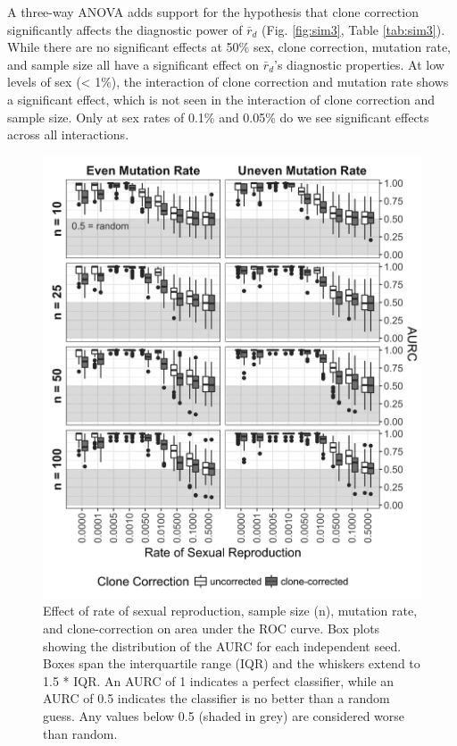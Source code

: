 \documentclass[double,11pt]{beavtex}
\begin{document}
  A three-way ANOVA adds support for the hypothesis that clone correction
  significantly affects the diagnostic power of \(\bar{r}_d\) (Fig.
  \ref{fig:sim3}, Table \ref{tab:sim3}). While there are no significant
  effects at 50\% sex, clone correction, mutation rate, and sample size
  all have a significant effect on \(\bar{r}_d\)'s diagnostic properties.
  At low levels of sex (\textless{} 1\%), the interaction of clone
  correction and mutation rate shows a significant effect, which is not
  seen in the interaction of clone correction and sample size. Only at sex
  rates of 0.1\% and 0.05\% do we see significant effects across all
  interactions.
  
  \begin{figure}
  
  {\centering \includegraphics[width=0.8\linewidth]{figure/simulations/AURC_box_plot} 
  
  }
  
  \caption[Effect of rate of sexual reproduction, sample size, mutation
  rate, and clone-correction on area under the ROC curve.]{Effect of rate of sexual reproduction, sample size (n), mutation rate,
  and clone-correction on area under the ROC curve. Box plots showing the
  distribution of the AURC for each independent seed. Boxes span the interquartile
  range (IQR) and the whiskers extend to 1.5 * IQR. An AURC of 1 indicates a
  perfect classifier, while an AURC of 0.5 indicates the classifier is no better
  than a random guess. Any values below 0.5 (shaded in grey) are considered worse
  than random.}\label{fig:sim2}
  \end{figure}
  
\end{document}
